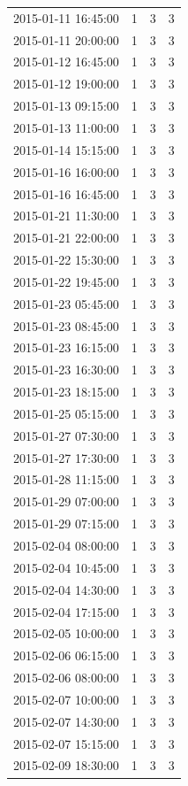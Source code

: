 \begin{tabular}{lrrr}
2015-01-11 16:45:00 & 1 & 3 & 3 \\
2015-01-11 20:00:00 & 1 & 3 & 3 \\
2015-01-12 16:45:00 & 1 & 3 & 3 \\
2015-01-12 19:00:00 & 1 & 3 & 3 \\
2015-01-13 09:15:00 & 1 & 3 & 3 \\
2015-01-13 11:00:00 & 1 & 3 & 3 \\
2015-01-14 15:15:00 & 1 & 3 & 3 \\
2015-01-16 16:00:00 & 1 & 3 & 3 \\
2015-01-16 16:45:00 & 1 & 3 & 3 \\
2015-01-21 11:30:00 & 1 & 3 & 3 \\
2015-01-21 22:00:00 & 1 & 3 & 3 \\
2015-01-22 15:30:00 & 1 & 3 & 3 \\
2015-01-22 19:45:00 & 1 & 3 & 3 \\
2015-01-23 05:45:00 & 1 & 3 & 3 \\
2015-01-23 08:45:00 & 1 & 3 & 3 \\
2015-01-23 16:15:00 & 1 & 3 & 3 \\
2015-01-23 16:30:00 & 1 & 3 & 3 \\
2015-01-23 18:15:00 & 1 & 3 & 3 \\
2015-01-25 05:15:00 & 1 & 3 & 3 \\
2015-01-27 07:30:00 & 1 & 3 & 3 \\
2015-01-27 17:30:00 & 1 & 3 & 3 \\
2015-01-28 11:15:00 & 1 & 3 & 3 \\
2015-01-29 07:00:00 & 1 & 3 & 3 \\
2015-01-29 07:15:00 & 1 & 3 & 3 \\
2015-02-04 08:00:00 & 1 & 3 & 3 \\
2015-02-04 10:45:00 & 1 & 3 & 3 \\
2015-02-04 14:30:00 & 1 & 3 & 3 \\
2015-02-04 17:15:00 & 1 & 3 & 3 \\
2015-02-05 10:00:00 & 1 & 3 & 3 \\
2015-02-06 06:15:00 & 1 & 3 & 3 \\
2015-02-06 08:00:00 & 1 & 3 & 3 \\
2015-02-07 10:00:00 & 1 & 3 & 3 \\
2015-02-07 14:30:00 & 1 & 3 & 3 \\
2015-02-07 15:15:00 & 1 & 3 & 3 \\
2015-02-09 18:30:00 & 1 & 3 & 3 \\

\end{tabular}
